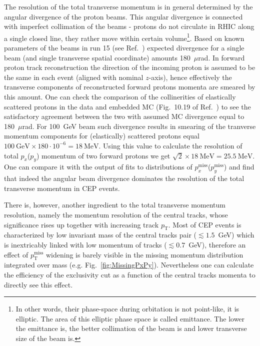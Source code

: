 The resolution of the total transverse momentum is in general determined by the angular divergence of the proton beams. This angular divergence is connected with imperfect collimation of the beams - protons do not circulate in RHIC along a single closed line, they rather move within certain volume\footnote{In other words, their phase-space during orbitation is not point-like, it is elliptic. The area of this elliptic phase space is called emittance. The lower the emittance is, the better collimation of the beam is and lower transverse size of the beam is.}. Based on known parameters of the beams in run 15 (see Ref.~\cite{run15Overview}) expected divergence for a single beam (and single transverse spatial coordinate) amounts 180~$\mu$rad. In forward proton track reconstruction the direction of the incoming proton is assumed to be the same in each event (aligned with nominal $z$-axis), hence effectively the transverse components of reconstructed forward protons momenta are smeared by this amount. One can check the comparison of the collinerities of elastically scattered protons in the data and embedded MC (Fig.~10.19 of Ref.~\cite{supplementaryNote}) to see the satisfactory agreement between the two with assumed MC divergence equal to 180~$\mu$rad. For 100~GeV beam such divergence results in smearing of the tranverse momentum components for (elastically) scattered protons equal $100~\text{GeV}\times 180\cdot 10^{-6} = 18~\text{MeV}$. Using this value to calculate the resolution of total $p_{x}$($p_{y}$) momentum of two forward protons we get $\sqrt{2}\times 18~\text{MeV} = 25.5~\text{MeV}$. One can compare it with the output of fits to distributions of  $p_{x}^{\text{miss}}$($p_{y}^{\text{miss}}$) and find that indeed the angular beam divergence dominates the resolution of the total transverse momentum in CEP events. 

There is, however, another ingredient to the total transverse momentum resolution, namely the momentum resolution of the central tracks, whose significance rises up together with increasing track $p_{\text{T}}$. Most of CEP events is characterized by low invariant mass of the central tracks pair ($\lesssim 1.5$~GeV) which is inextricably linked with low momentum of tracks ($\lesssim 0.7$~GeV), therefore an effect of $p_{\text{T}}^{\text{miss}}$ widening is barely visible in the missing momentum distribution integrated over mass (e.g. Fig.~\ref{fig:MissingPxPy}). Nevertheless one can calculate the efficiency of the exclusivity cut as a function of the central tracks momenta to directly see this effect.

